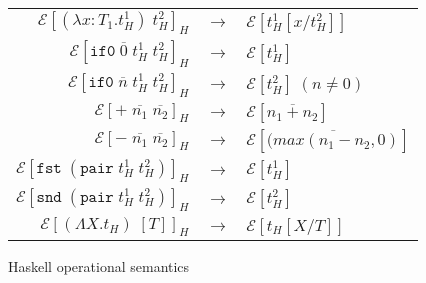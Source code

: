 \begin{figure}
\onehalfspacing
\begin{center}
\begin{tabular}{rcl}
$\mathscr{E}[(\lambda x:T_{1}.t_{H}^{1})\;t_{H}^{2}]_{H}$ & $\rightarrow$ & $\mathscr{E}[t_{H}^{1}[x/t_{H}^{2}]]$ \\
$\mathscr{E}[\mathtt{if0}\;\overline{0}\;t_{H}^{1}\;t_{H}^{2}]_{H}$ & $\rightarrow$ & $\mathscr{E}[t_{H}^{1}]$ \\
$\mathscr{E}[\mathtt{if0}\;\overline{n}\;t_{H}^{1}\;t_{H}^{2}]_{H}$ & $\rightarrow$ & $\mathscr{E}[t_{H}^{2}]\;(n\neq0)$ \\
$\mathscr{E}[+\;\overline{n_{1}}\;\overline{n_{2}}]_{H}$ & $\rightarrow$ & $\mathscr{E}[\overline{n_{1}+n_{2}}]$ \\
$\mathscr{E}[-\;\overline{n_{1}}\;\overline{n_{2}}]_{H}$ & $\rightarrow$ & $\mathscr{E}[\overline{(max(n_{1}-n_{2},0)}]$ \\
$\mathscr{E}[\mathtt{fst}\;(\mathtt{pair}\;t_{H}^{1}\;t_{H}^{2})]_{H}$ & $\rightarrow$ & $\mathscr{E}[t_{H}^{1}]$ \\
$\mathscr{E}[\mathtt{snd}\;(\mathtt{pair}\;t_{H}^{1}\;t_{H}^{2})]_{H}$ & $\rightarrow$ & $\mathscr{E}[t_{H}^{2}]$ \\
$\mathscr{E}[(\Lambda X.t_{H})\;[T]]_{H}$ & $\rightarrow$ & $\mathscr{E}[t_{H}[X/T]]$
\end{tabular}
\end{center}
\caption{Haskell operational semantics}
\label{fig:hos}
\end{figure}